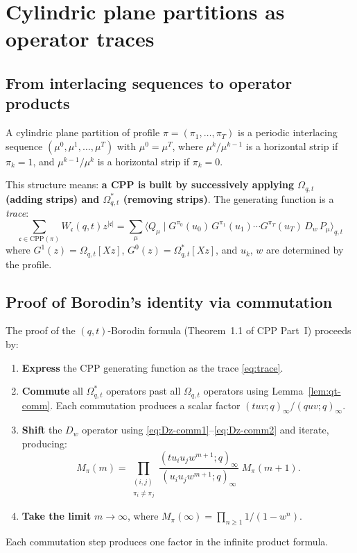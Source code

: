 \documentclass[11pt]{article}
\newcommand{\CPP}{\mathrm{CPP}}
\theoremstyle{plain}
\theoremstyle{definition}
\begin{document}
\section{Cylindric plane partitions as operator traces}

\subsection{From interlacing sequences to operator products}
A cylindric plane partition of profile $\pi = (\pi_1, \ldots, \pi_T)$ is a periodic interlacing sequence $(\mu^0, \mu^1, \ldots, \mu^T)$ with $\mu^0 = \mu^T$, where $\mu^k/\mu^{k-1}$ is a horizontal strip if $\pi_k = 1$, and $\mu^{k-1}/\mu^k$ is a horizontal strip if $\pi_k = 0$.

This structure means: \textbf{a CPP is built by successively applying $\Omega_{q,t}$ (adding strips) and $\Omega^*_{q,t}$ (removing strips)}.
The generating function is a \emph{trace}:
\begin{equation}\label{eq:trace}
\sum_{\mathfrak{c} \in \CPP(\pi)} W_\mathfrak{c}(q,t) z^{|\mathfrak{c}|}
= \sum_\mu \langle Q_\mu \mid G^{\pi_0}(u_0)\, G^{\pi_1}(u_1) \cdots G^{\pi_T}(u_T)\, D_w\, P_\mu \rangle_{q,t}
\end{equation}
where $G^1(z) = \Omega_{q,t}[Xz]$, $G^0(z) = \Omega^*_{q,t}[Xz]$, and $u_k$, $w$ are determined by the profile.

\subsection{Proof of Borodin's identity via commutation}
The proof of the $(q,t)$-Borodin formula (Theorem~1.1 of CPP Part~I) proceeds by:
\begin{enumerate}
\item \textbf{Express} the CPP generating function as the trace \eqref{eq:trace}.
\item \textbf{Commute} all $\Omega^*_{q,t}$ operators past all $\Omega_{q,t}$ operators using Lemma~\ref{lem:qt-comm}. Each commutation produces a scalar factor $(tuv;q)_\infty / (quv;q)_\infty$.
\item \textbf{Shift} the $D_w$ operator using \eqref{eq:Dz-comm1}--\eqref{eq:Dz-comm2} and iterate, producing:
\[
M_\pi(m) = \prod_{\substack{(i,j)\\\pi_i \neq \pi_j}} \frac{(tu_iu_jw^{m+1};q)_\infty}{(u_iu_jw^{m+1};q)_\infty}\; M_\pi(m+1).
\]
\item \textbf{Take the limit} $m \to \infty$, where $M_\pi(\infty) = \prod_{n \geq 1} 1/(1-w^n)$.
\end{enumerate}
Each commutation step produces one factor in the infinite product formula.
\end{document}
